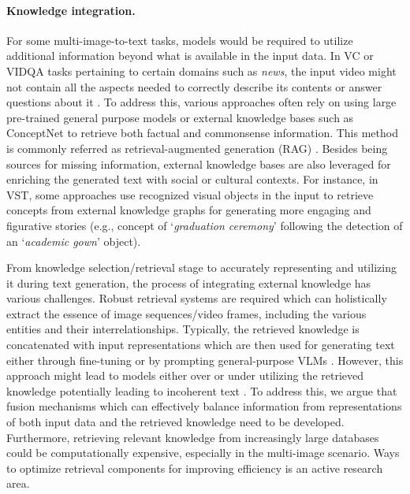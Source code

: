 \paragraph{Knowledge integration.}
For some multi-image-to-text tasks, models would be required to utilize additional information beyond what is available in the input data. In \color{xkcdVividBlue}VC \color{black} or \color{xkcdVividBlue}VIDQA \color{black} tasks pertaining to certain domains such as \emph{news}, the input video might not contain all the aspects needed to correctly describe its contents or answer questions about it \cite{vc_kg_task,videoqa_kg_task}. To address this, various approaches often rely on using large pre-trained general purpose models or external knowledge bases such as ConceptNet \cite{concept_net} to retrieve both factual and commonsense information. This method is commonly referred as retrieval-augmented generation (RAG) \cite{rag}. Besides being sources for missing information, external knowledge bases are also leveraged for enriching the generated text with social or cultural contexts. For instance, in \color{xkcdVividBlue}VST\color{black}, some approaches use recognized visual objects in the input to retrieve concepts from external knowledge graphs for generating more engaging and figurative stories (e.g., concept of `\textit{graduation ceremony}' following the detection of an `\textit{academic gown}' object).

From knowledge selection/retrieval stage to accurately representing and utilizing it during text generation, the process of integrating external knowledge has various challenges. Robust retrieval systems are required which can holistically extract the essence of image sequences/video frames, including the various entities and their interrelationships. Typically, the retrieved knowledge is concatenated with input representations which are then used for generating text either through fine-tuning \cite{kg_finetuning} or by prompting general-purpose VLMs \cite{kg_promptbased}. However, this approach might lead to models either over or under utilizing the retrieved knowledge potentially leading to incoherent text \cite{rag_issues}. To address this, we argue that fusion mechanisms which can effectively balance information from representations of both input data and the retrieved knowledge need to be developed. Furthermore, retrieving relevant knowledge from increasingly large databases could be computationally expensive, especially in the multi-image scenario. Ways to optimize retrieval components for improving efficiency is an active research area.


